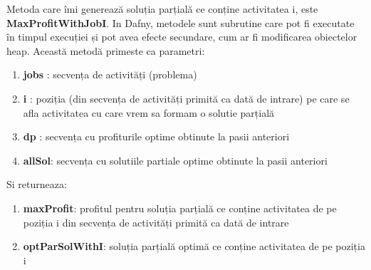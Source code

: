 Metoda care îmi generează soluția parțială ce conține activitatea i, este \textbf{MaxProfitWithJobI}. In Dafny, metodele sunt subrutine care pot fi executate în timpul execuției și pot avea efecte secundare, cum ar fi modificarea obiectelor heap.\cite{DBLP:journals/jlap/BlazquezMS23}
Această metodă primeste ca parametri: 
\begin{enumerate}
    \item \textbf{jobs} : secvența de activități (problema)
    \item \textbf{i} : poziția (din secvența de activități primită ca dată de intrare) pe care se afla activitatea cu care vrem sa formam o solutie parțială 
    \item \textbf{dp} : secvența cu profiturile optime obtinute la pasii anteriori
    \item \textbf{allSol}: secvența cu solutiile partiale optime obtinute la pasii anteriori
\end{enumerate}
Si returneaza:
\begin{enumerate}
    \item \textbf{maxProfit}: profitul pentru soluția parțială ce conține activitatea de pe poziția i din secvența de activități primită ca dată de intrare
    \item \textbf{optParSolWithI}: soluția parțială optimă ce conține activitatea de pe poziția i
\end{enumerate}
